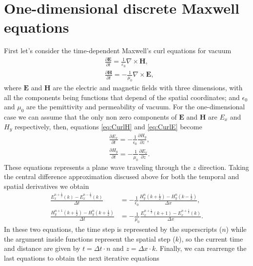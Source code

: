 \documentclass[12pt, oneside]{book}
\begin{document}
\section{One-dimensional discrete Maxwell equations}

First let's consider the time-dependent Maxwell's curl equations for vacuum \cite{jackson, griffiths}
\begin{align}
    &\frac{\partial \boldsymbol{E}}{\partial t}=\frac{1}{\varepsilon_{0}} \nabla \times \boldsymbol{H}, \label{eq:CurlH} \\
    &\frac{\partial \boldsymbol{H}}{\partial t}=-\frac{1}{\mu_{0}} \nabla \times \boldsymbol{E}, \label{eq:CurlE}
\end{align}
where $\boldsymbol{E}$ and $\boldsymbol{H}$ are the electric and magnetic fields with three dimensions, with all the components being functions that depend of the spatial coordinates; and $\epsilon_0$ and $\mu_0$ are the pemittivity and permeability of vacuum. For the one-dimensional case we can assume that the only non zero components of $\boldsymbol{E}$ and $\boldsymbol{H}$ are $E_x$ and $H_y$ respectively, then, equations \ref{eq:CurlH} and \ref{eq:CurlE} become
\begin{align}
    & \frac{\partial E_x}{\partial t}=-\frac{1}{\epsilon_0}  \frac{\partial H_y}{\partial z}, \\
    & \frac{\partial H_y}{\partial t}=-\frac{1}{\mu_0} \frac{\partial E_x}{\partial z}.
\end{align}
These equations represents a plane wave traveling through the $z$ direction. Taking the central difference approximation discused above for both the temporal and spatial derivatives we obtain \cite{Sullivan2020}
\begin{align}
    \frac{E_x^{n+\frac{1}{2}}(k)-E_x^{n-\frac{1}{2}}(k)}{\Delta t} &=-\frac{1}{\epsilon_0}\frac{H_y^n \left(k+\frac{1}{2}\right) - H_y^n\left(k-\frac{1}{2}\right)}{\Delta x}, \\
    \frac{H_y^{n+1} \left(k+\frac{1}{2}\right) -H_y^{n}\left( k +\frac{1}{2}\right)}{\Delta t} &=-\frac{1}{\mu_0}\frac{E_x^{n+\frac{1}{2}} \left(k+1\right) - E_x^{n+\frac{1}{2}}\left(k\right)}{\Delta x}.
\end{align}
In these two equations, the time step is represented by the superscripts ($n$) while the argument inside functions represent the spatial step ($k$), so the current time and distance are given by $t = \Delta t \cdot n$ and $z = \Delta x \cdot k$. Finally, we can rearrenge the last equations to obtain the next iterative equations
\end{document}
